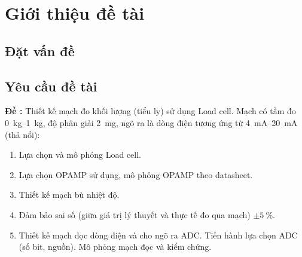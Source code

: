 \chapter{Giới thiệu đề tài}
\label{chap:c1}

\section{Đặt vấn đề}
\label{sec:c1:dat-van-de}


\section{Yêu cầu đề tài}
\label{sec:c1:yeu-cau}

\noindent\textbf{Đề \SoDeTai:} Thiết kế mạch đo khối lượng (tiểu ly) sử dụng Load cell.
Mạch có tầm đo \qtyrange{0}{1}{\kilo\gram}, độ phân giải \qty{2}{\milli\gram},
ngõ ra là dòng điện tương ứng từ \qtyrange{4}{20}{\milli\ampere} (thả nổi):
\begin{enumerate}[label=\alph*.]
    \item Lựa chọn và mô phỏng Load cell.
    \item Lựa chọn OPAMP sử dụng, mô phỏng OPAMP theo datasheet.
    \item Thiết kế mạch bù nhiệt độ.
    \item Đảm bảo sai số (giữa giá trị lý thuyết và thực tế đo qua mạch) $\pm\qty{5}{\percent}$.
    \item Thiết kế mạch đọc dòng điện và cho ngõ ra ADC. Tiến hành lựa chọn ADC
          (số bit, nguồn). Mô phỏng mạch đọc và kiểm chứng.
\end{enumerate}

